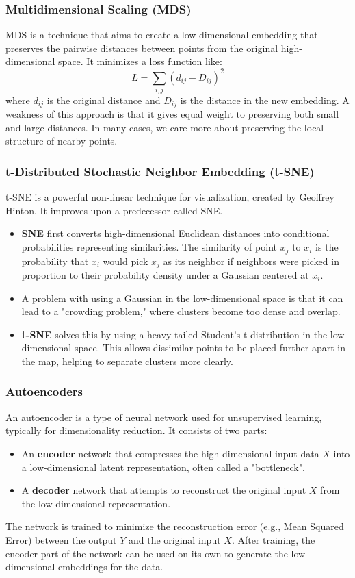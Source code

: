 \documentclass{article}
\begin{document}
\begin{multicols}{2}
	\subsubsection{Multidimensional Scaling (MDS)}
	MDS is a technique that aims to create a low-dimensional embedding that preserves the pairwise distances between points from the original high-dimensional space. It minimizes a loss function like:
	$$ L = \sum_{i,j} (d_{ij} - D_{ij})^2 $$
	where $d_{ij}$ is the original distance and $D_{ij}$ is the distance in the new embedding. A weakness of this approach is that it gives equal weight to preserving both small and large distances. In many cases, we care more about preserving the local structure of nearby points.

	\subsubsection{t-Distributed Stochastic Neighbor Embedding (t-SNE)}
	t-SNE is a powerful non-linear technique for visualization, created by Geoffrey Hinton. It improves upon a predecessor called SNE.
	\begin{itemize}
		\item \textbf{SNE} first converts high-dimensional Euclidean distances into conditional probabilities representing similarities. The similarity of point $x_j$ to $x_i$ is the probability that $x_i$ would pick $x_j$ as its neighbor if neighbors were picked in proportion to their probability density under a Gaussian centered at $x_i$.
		\item A problem with using a Gaussian in the low-dimensional space is that it can lead to a "crowding problem," where clusters become too dense and overlap.
		\item \textbf{t-SNE} solves this by using a heavy-tailed Student's t-distribution in the low-dimensional space. This allows dissimilar points to be placed further apart in the map, helping to separate clusters more clearly.
	\end{itemize}

	\subsubsection{Autoencoders}
	An autoencoder is a type of neural network used for unsupervised learning, typically for dimensionality reduction. It consists of two parts:
	\begin{itemize}
		\item An \textbf{encoder} network that compresses the high-dimensional input data $X$ into a low-dimensional latent representation, often called a "bottleneck".
		\item A \textbf{decoder} network that attempts to reconstruct the original input $X$ from the low-dimensional representation.
	\end{itemize}
	The network is trained to minimize the reconstruction error (e.g., Mean Squared Error) between the output $Y$ and the original input $X$. After training, the encoder part of the network can be used on its own to generate the low-dimensional embeddings for the data.



\end{multicols}
\end{document}
